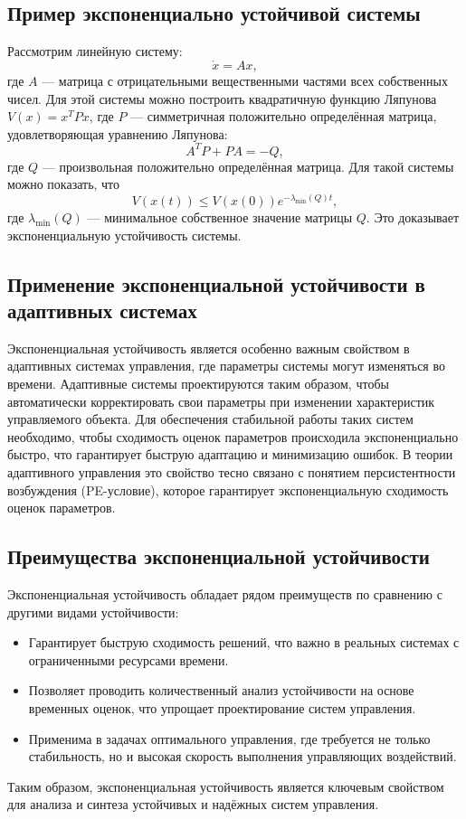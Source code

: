 \documentclass[a4paper,14pt]{extarticle} %
\begin{document}
\subsection{Пример экспоненциально устойчивой системы}

Рассмотрим линейную систему:
\[
\dot{x} = Ax,
\]
где \(A\) — матрица с отрицательными вещественными частями всех собственных чисел. Для этой системы можно построить квадратичную функцию Ляпунова \(V(x) = x^T P x\), где \(P\) — симметричная положительно определённая матрица, удовлетворяющая уравнению Ляпунова:
\[
A^T P + P A = -Q,
\]
где \(Q\) — произвольная положительно определённая матрица. Для такой системы можно показать, что
\[
V(x(t)) \leq V(x(0)) e^{-\lambda_{\min}(Q)t},
\]
где \(\lambda_{\min}(Q)\) — минимальное собственное значение матрицы \(Q\). Это доказывает экспоненциальную устойчивость системы.

\subsection{Применение экспоненциальной устойчивости в адаптивных системах}

Экспоненциальная устойчивость является особенно важным свойством в адаптивных системах управления, где параметры системы могут изменяться во времени. Адаптивные системы проектируются таким образом, чтобы автоматически корректировать свои параметры при изменении характеристик управляемого объекта. Для обеспечения стабильной работы таких систем необходимо, чтобы сходимость оценок параметров происходила экспоненциально быстро, что гарантирует быструю адаптацию и минимизацию ошибок. В теории адаптивного управления это свойство тесно связано с понятием персистентности возбуждения (PE-условие), которое гарантирует экспоненциальную сходимость оценок параметров.

\subsection{Преимущества экспоненциальной устойчивости}

Экспоненциальная устойчивость обладает рядом преимуществ по сравнению с другими видами устойчивости:
\begin{itemize}
    \item Гарантирует быструю сходимость решений, что важно в реальных системах с ограниченными ресурсами времени.
    \item Позволяет проводить количественный анализ устойчивости на основе временных оценок, что упрощает проектирование систем управления.
    \item Применима в задачах оптимального управления, где требуется не только стабильность, но и высокая скорость выполнения управляющих воздействий.
\end{itemize}
Таким образом, экспоненциальная устойчивость является ключевым свойством для анализа и синтеза устойчивых и надёжных систем управления.
\end{document}
